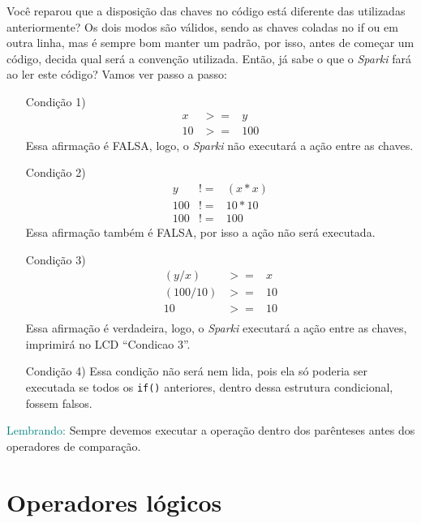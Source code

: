     Você reparou que a disposição das chaves no código está diferente das utilizadas anteriormente? Os dois modos são válidos, sendo as chaves coladas no if ou em outra linha, mas é sempre bom manter um padrão, por isso, antes de começar um código, decida qual será a convenção utilizada. Então, já sabe o que o \textsl{Sparki} fará ao ler este código? Vamos ver passo a passo:
    
    \begin{itemize}
        \item[Condição 1)]
        \begin{eqnarray}
        x & >= & y\\
        10 & >= & 100 \nonumber     \end{eqnarray}
        Essa afirmação é FALSA, logo, o \textsl{Sparki} não executará a ação entre as chaves.
        \item[Condição 2)]
        \begin{eqnarray}
        y & != & (x * x)\\
        100 & != & 10 * 10 \nonumber\\
        100 & != & 100 \nonumber
        \end{eqnarray}
        Essa afirmação também é FALSA, por isso a ação não será executada.
        \item[Condição 3)]
        \begin{eqnarray}
        (y / x) & >= & x\\
        (100 / 10) & >= & 10 \nonumber\\
        10 & >= & 10 \nonumber\\
        \end{eqnarray}
        Essa afirmação é verdadeira, logo, o \textsl{Sparki} executará a ação entre as chaves, imprimirá no LCD ``Condicao 3''.
        \item[Condição 4)]
        Essa condição não será nem lida, pois ela só poderia ser executada se todos os \lstinline[columns=fixed]{if()} anteriores, dentro dessa estrutura condicional, fossem falsos.
    \end{itemize}
    
    \begin{center}
    \textcolor{teal}{Lembrando:}
    Sempre devemos executar a operação dentro dos parênteses antes dos operadores de comparação. 
    \end{center}
 
\section{Operadores lógicos}
